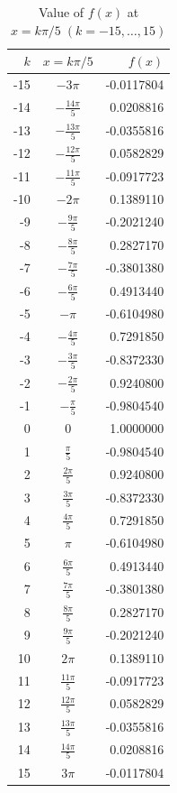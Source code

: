 \documentclass[11pt]{article}
\begin{document}
\small
\begin{longtable}{|r|c|r|}
  \caption{Value of $f(x)$ at $x=k\pi/5\;(k=-15,\dots,15)$}\label{tab:fx}\\
  \hline
  \textbf{$k$} & \textbf{$x=k\pi/5$} & \textbf{$f(x)$} \\ \hline\hline
  -15 & $-3\pi$             & -0.0117804 \\ \hline
  -14 & $-\tfrac{14\pi}{5}$ &  0.0208816 \\ \hline
  -13 & $-\tfrac{13\pi}{5}$ & -0.0355816 \\ \hline
  -12 & $-\tfrac{12\pi}{5}$ &  0.0582829 \\ \hline
  -11 & $-\tfrac{11\pi}{5}$ & -0.0917723 \\ \hline
  -10 & $-2\pi$             &  0.1389110 \\ \hline
   -9 & $-\tfrac{9\pi}{5}$  & -0.2021240 \\ \hline
   -8 & $-\tfrac{8\pi}{5}$  &  0.2827170 \\ \hline
   -7 & $-\tfrac{7\pi}{5}$  & -0.3801380 \\ \hline
   -6 & $-\tfrac{6\pi}{5}$  &  0.4913440 \\ \hline
   -5 & $-\pi$              & -0.6104980 \\ \hline
   -4 & $-\tfrac{4\pi}{5}$  &  0.7291850 \\ \hline
   -3 & $-\tfrac{3\pi}{5}$  & -0.8372330 \\ \hline
   -2 & $-\tfrac{2\pi}{5}$  &  0.9240800 \\ \hline
   -1 & $-\tfrac{\pi}{5}$   & -0.9804540 \\ \hline
    0 & $0$                 &  1.0000000 \\ \hline
    1 & $\tfrac{\pi}{5}$    & -0.9804540 \\ \hline
    2 & $\tfrac{2\pi}{5}$   &  0.9240800 \\ \hline
    3 & $\tfrac{3\pi}{5}$   & -0.8372330 \\ \hline
    4 & $\tfrac{4\pi}{5}$   &  0.7291850 \\ \hline
    5 & $\pi$               & -0.6104980 \\ \hline
    6 & $\tfrac{6\pi}{5}$   &  0.4913440 \\ \hline
    7 & $\tfrac{7\pi}{5}$   & -0.3801380 \\ \hline
    8 & $\tfrac{8\pi}{5}$   &  0.2827170 \\ \hline
    9 & $\tfrac{9\pi}{5}$   & -0.2021240 \\ \hline
   10 & $2\pi$              &  0.1389110 \\ \hline
   11 & $\tfrac{11\pi}{5}$  & -0.0917723 \\ \hline
   12 & $\tfrac{12\pi}{5}$  &  0.0582829 \\ \hline
   13 & $\tfrac{13\pi}{5}$  & -0.0355816 \\ \hline
   14 & $\tfrac{14\pi}{5}$  &  0.0208816 \\ \hline
   15 & $3\pi$             & -0.0117804 \\ \hline
\end{longtable}
\end{document}
